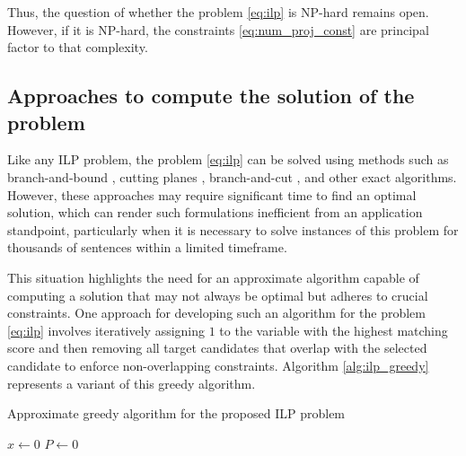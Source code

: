Thus, the question of whether the problem \eqref{eq:ilp} is NP-hard remains open.
However, if it is NP-hard, the constraints \eqref{eq:num_proj_const} are
principal factor to that complexity.

\subsection{Approaches to compute the solution of the problem}
Like any ILP problem, the problem \eqref{eq:ilp} can be solved using methods such as
branch-and-bound \cite{land2010automatic}, cutting planes \cite{gilmore1963linear, dyckhoff1981new},
branch-and-cut \cite{branchAndCut}, and other exact algorithms.
However, these approaches may require significant time to find an optimal solution,
which can render such formulations inefficient from an application standpoint,
particularly when it is necessary to solve instances of this problem for thousands
of sentences within a limited timeframe.

This situation highlights the need for an approximate algorithm capable of computing
a solution that may not always be optimal but adheres to crucial constraints. One
approach for developing such an algorithm for the problem \eqref{eq:ilp} involves
iteratively assigning \( 1 \) to the variable with the highest matching score and
then removing all target candidates that overlap with the selected candidate to
enforce non-overlapping constraints. Algorithm \ref{alg:ilp_greedy} represents a
variant of this greedy algorithm.

\begin{algorithm}
  \caption{Approximate greedy algorithm for the proposed ILP problem} \label{alg:ilp_greedy}

  \( x \gets 0 \) \;
  \( P \gets 0 \) 
\end{algorithm}

